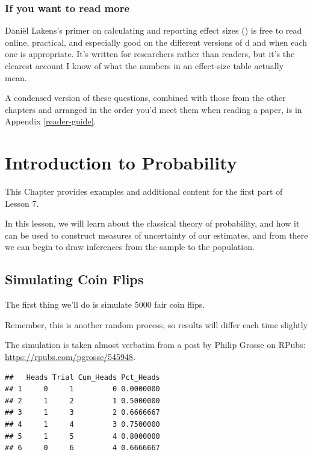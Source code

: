 \documentclass[
]{book}
\begin{document}
\subsection{If you want to read more}\label{if-you-want-to-read-more-5}

Daniël Lakens's primer on calculating and reporting effect sizes () is free to read online, practical, and especially good on the different versions of d and when each one is appropriate. It's written for researchers rather than readers, but it's the clearest account I know of what the numbers in an effect-size table actually mean.

A condensed version of these questions, combined with those from the other chapters and arranged in the order you'd meet them when reading a paper, is in Appendix \ref{reader-guide}.

\chapter{Introduction to Probability}\label{probability}

This Chapter provides examples and additional content for the first part of Lesson 7.

In this lesson, we will learn about the classical theory of probability, and how it can be used to construct measures of uncertainty of our estimates, and from there we can begin to draw inferences from the sample to the population.

\section{Simulating Coin Flips}\label{simulating-coin-flips}

The first thing we'll do is simulate 5000 fair coin flips.

Remember, this is another random process, so results will differ each time slightly

The simulation is taken almost verbatim from a post by Philip Grosse on RPubs: \url{https://rpubs.com/pgrosse/545948}.

\begin{verbatim}
##   Heads Trial Cum_Heads Pct_Heads
## 1     0     1         0 0.0000000
## 2     1     2         1 0.5000000
## 3     1     3         2 0.6666667
## 4     1     4         3 0.7500000
## 5     1     5         4 0.8000000
## 6     0     6         4 0.6666667
\end{verbatim}
\end{document}
